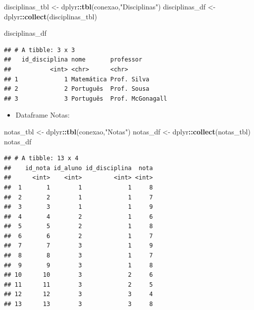 \documentclass[
]{article}
\newenvironment{Shaded}{\begin{snugshade}}{\end{snugshade}}
\newcommand{\FunctionTok}[1]{\textcolor[rgb]{0.13,0.29,0.53}{\textbf{#1}}}
\newcommand{\NormalTok}[1]{#1}
\newcommand{\OtherTok}[1]{\textcolor[rgb]{0.56,0.35,0.01}{#1}}
\newcommand{\SpecialCharTok}[1]{\textcolor[rgb]{0.81,0.36,0.00}{\textbf{#1}}}
\newcommand{\StringTok}[1]{\textcolor[rgb]{0.31,0.60,0.02}{#1}}
\providecommand{\tightlist}{%
  \setlength{\itemsep}{0pt}\setlength{\parskip}{0pt}}
\begin{document}
\begin{Shaded}
\begin{Highlighting}[]
\NormalTok{disciplinas\_tbl }\OtherTok{\textless{}{-}}\NormalTok{ dplyr}\SpecialCharTok{::}\FunctionTok{tbl}\NormalTok{(conexao,}\StringTok{"Disciplinas"}\NormalTok{)}
\NormalTok{disciplinas\_df }\OtherTok{\textless{}{-}}\NormalTok{ dplyr}\SpecialCharTok{::}\FunctionTok{collect}\NormalTok{(disciplinas\_tbl)}
\end{Highlighting}
\end{Shaded}

\begin{Shaded}
\begin{Highlighting}[]
\NormalTok{disciplinas\_df}
\end{Highlighting}
\end{Shaded}

\begin{verbatim}
## # A tibble: 3 x 3
##   id_disciplina nome       professor       
##           <int> <chr>      <chr>           
## 1             1 Matemática Prof. Silva     
## 2             2 Português  Prof. Sousa     
## 3             3 Português  Prof. McGonagall
\end{verbatim}

\begin{itemize}
\tightlist
\item
  Dataframe Notas:
\end{itemize}

\begin{Shaded}
\begin{Highlighting}[]
\NormalTok{notas\_tbl }\OtherTok{\textless{}{-}}\NormalTok{ dplyr}\SpecialCharTok{::}\FunctionTok{tbl}\NormalTok{(conexao,}\StringTok{"Notas"}\NormalTok{)}
\NormalTok{notas\_df }\OtherTok{\textless{}{-}}\NormalTok{ dplyr}\SpecialCharTok{::}\FunctionTok{collect}\NormalTok{(notas\_tbl)}
\NormalTok{notas\_df}
\end{Highlighting}
\end{Shaded}

\begin{verbatim}
## # A tibble: 13 x 4
##    id_nota id_aluno id_disciplina  nota
##      <int>    <int>         <int> <int>
##  1       1        1             1     8
##  2       2        1             1     7
##  3       3        1             1     9
##  4       4        2             1     6
##  5       5        2             1     8
##  6       6        2             1     7
##  7       7        3             1     9
##  8       8        3             1     7
##  9       9        3             1     8
## 10      10        3             2     6
## 11      11        3             2     5
## 12      12        3             3     4
## 13      13        3             3     8
\end{verbatim}
\end{document}
